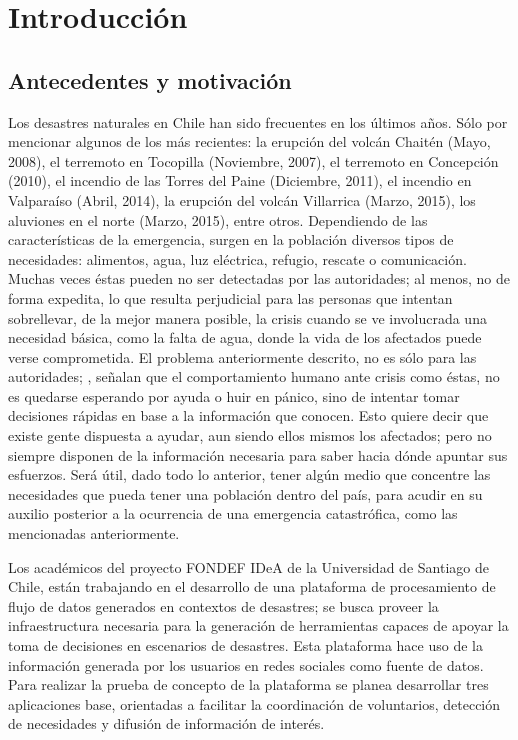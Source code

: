 \chapter{Introducción}
\label{cap:introduccion}

\section{Antecedentes y motivación}
\label{intro:motivacion}

Los desastres naturales en Chile han sido frecuentes en los últimos años. Sólo por mencionar algunos de los más recientes: la erupción del volcán Chaitén (Mayo, 2008), el terremoto en Tocopilla (Noviembre, 2007), el terremoto en Concepción (2010), el incendio de las Torres del Paine (Diciembre, 2011), el incendio en Valparaíso (Abril, 2014), la erupción del volcán Villarrica (Marzo, 2015), los aluviones en el norte (Marzo, 2015), entre otros. Dependiendo de las características de la emergencia, surgen en la población diversos tipos de necesidades: alimentos, agua, luz eléctrica, refugio, rescate o comunicación. Muchas veces éstas pueden no ser detectadas por las autoridades; al menos, no de forma expedita, lo que resulta perjudicial para las personas que intentan sobrellevar, de la mejor manera posible, la crisis cuando se ve involucrada una necesidad básica, como la falta de agua, donde la vida de los afectados puede verse comprometida. El problema anteriormente descrito, no es sólo para las autoridades; \cite{ChatoSurvey}, señalan que el comportamiento humano ante crisis como éstas, no es quedarse esperando por ayuda o huir en pánico, sino de intentar tomar decisiones rápidas en base a la información que conocen. Esto quiere decir que existe gente dispuesta a ayudar, aun siendo ellos mismos los afectados; pero no siempre disponen de la información necesaria para saber hacia dónde apuntar sus esfuerzos. Será útil, dado todo lo anterior, tener algún medio que concentre las necesidades que pueda tener una población dentro del país, para acudir en su auxilio posterior a la ocurrencia de una emergencia catastrófica, como las mencionadas anteriormente.

Los académicos del proyecto FONDEF IDeA de la Universidad de Santiago de Chile, están trabajando en el desarrollo de una plataforma de procesamiento de flujo de datos generados en contextos de desastres; se busca proveer la infraestructura necesaria para la generación de herramientas capaces de apoyar la toma de decisiones en escenarios de desastres. Esta plataforma hace uso de la información generada por los usuarios en redes sociales como fuente de datos. Para realizar la prueba de concepto de la plataforma se planea desarrollar tres aplicaciones base, orientadas a facilitar la coordinación de voluntarios, detección de necesidades y difusión de información de interés.

